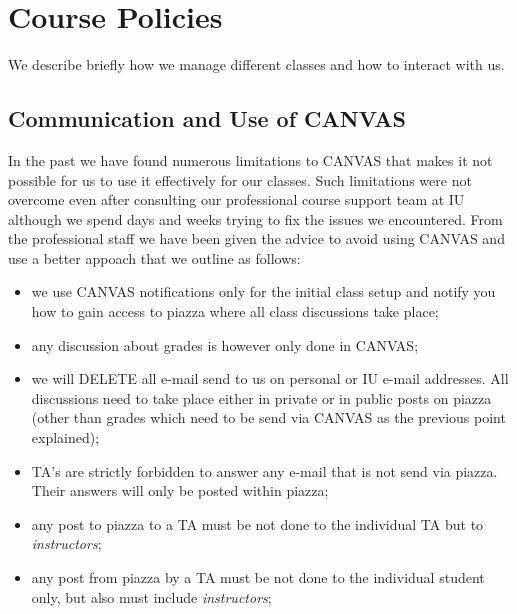 
\chapter{Course Policies}\label{C:course-2018}

\FILENAME

We describe briefly how we manage different classes and how to
interact with us. 

\section{Communication and Use of CANVAS}

In the past we have found numerous limitations to CANVAS that makes it
not possible for us to use it effectively for our classes. Such
limitations were not overcome even after consulting our professional
course support team at IU although we spend days and weeks trying to
fix the issues we encountered. From the professional staff we have
been given the advice to avoid using CANVAS and use a better appoach
that we outline as follows:

\begin{itemize}

\item we use CANVAS notifications only for the initial class setup and
  notify you how to gain access to piazza where all class discussions
  take place;

\item any discussion about grades is however only done in CANVAS;

\item we will DELETE all e-mail send to us on personal or IU e-mail
  addresses. All discussions need to take place either in private or
  in public posts on piazza (other than grades which need to be send
  via CANVAS as the previous point explained);

\item TA's are strictly forbidden to answer any e-mail that is not send
  via piazza. Their answers will only be posted within piazza;

\item any post to piazza to a TA must be not done to the individual TA
  but to {\em instructors};

\item any post from piazza by a TA must be not done to the individual
  student only, but also must include {\em instructors};

\end{itemize}

